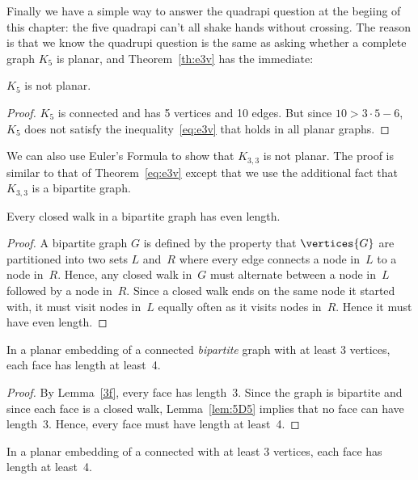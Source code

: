 Finally we have a simple way to answer the quadrapi question at the
begiing of this chapter: the five quadrapi can't all shake hands without
crossing.  The reason is that we know the quadrupi question is the same as
asking whether a complete graph $K_5$ is planar, and 
Theorem~\ref{th:e3v} has the immediate:
\begin{corollary}\label{k5not}
$K_5$ is not planar.
\end{corollary}
\begin{proof}
  $K_5$ is connected and has 5 vertices and 10 edges.  But since $10 > 3
  \cdot 5-6$, $K_5$ does not satisfy the inequality~\eqref{eq:e3v} that
  holds in all planar graphs.
\end{proof}

We can also use Euler's Formula to show that $K_{3, 3}$ is not
planar.  The proof is similar to that of Theorem~\ref{eq:e3v} except that
we use the additional fact that $K_{3, 3}$ is a bipartite graph.

\begin{editingnotes}
\begin{lemma*}\label{lem:5D5}
Every closed walk in a bipartite graph has even length.
\end{lemma*}

\begin{proof}
A bipartite graph $G$ is defined by the property that $\vertices{G}$
are partitioned into two sets $L$ and~$R$ where every edge
connects a node in~$L$ to a node in~$R$.  Hence, any closed walk
in~$G$ must alternate between a node in~$L$ followed by a node
in~$R$.  Since a closed walk ends on the same node it started with, it
must visit nodes in~$L$ equally often as it visits nodes in~$R$.
Hence it must have even length.
\end{proof}

\begin{corollary}\label{cor:5D6}
In a planar embedding of a connected \emph{bipartite} graph with at
least 3 vertices, each face has length at least~4.
\end{corollary}
\begin{proof}
  By Lemma~\ref{3f}, every face has length~3.  Since the graph is
  bipartite and since each face is a closed walk, Lemma~\ref{lem:5D5}
  implies that no face can have length~3.  Hence, every face must have
  length at least~4.
\end{proof}
\end{editingnotes}

\begin{lemma}\label{lem:5D6}
In a planar embedding of a connected  with at
least 3 vertices, each face has length at least~4.
\end{lemma}

